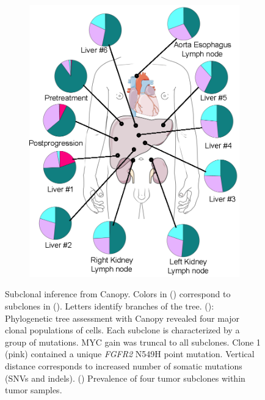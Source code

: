 \begin{figure}[htbp]
\begin{subfigure}{0.55\textwidth}
		\includegraphics[width=\textwidth,keepaspectratio]{images/240/canopy_clonal_fracs}
		\caption{}\label{fig:240:canopy_clonal_fracs}
	\end{subfigure}
	\caption[Subclonal inference from Canopy.]{Subclonal inference from Canopy. Colors in () correspond to subclones in (). Letters identify branches of the tree. (): Phylogenetic tree assessment with Canopy revealed four major clonal populations of cells. Each subclone is characterized by a group of mutations. MYC gain was truncal to all subclones. Clone 1 (pink) contained a unique \textit{FGFR2} N549H point mutation. Vertical distance corresponds to increased number of somatic mutations (SNVs and indels). () Prevalence of four tumor subclones within tumor samples.}
	\label{fig:240:canopy_results}
\end{figure}
